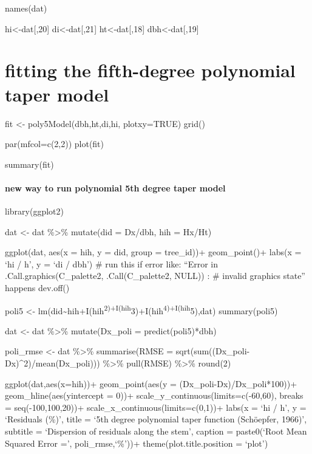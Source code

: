 \documentclass[
]{article}
\begin{document}
names(dat)

hi\textless-dat{[},20{]} di\textless-dat{[},21{]}
ht\textless-dat{[},18{]} dbh\textless-dat{[},19{]}

\hypertarget{fitting-the-fifth-degree-polynomial-taper-model}{%
\section{fitting the fifth-degree polynomial taper
model}\label{fitting-the-fifth-degree-polynomial-taper-model}}

fit \textless- poly5Model(dbh,ht,di,hi, plotxy=TRUE) grid()

par(mfcol=c(2,2)) plot(fit)

summary(fit)

\hypertarget{new-way-to-run-polynomial-5th-degree-taper-model}{%
\paragraph{new way to run polynomial 5th degree taper
model}\label{new-way-to-run-polynomial-5th-degree-taper-model}}

library(ggplot2)

dat \textless- dat \%\textgreater\% mutate(did = Dx/dbh, hih = Hx/Ht)

ggplot(dat, aes(x = hih, y = did, group = tree\_id))+ geom\_point()+
labs(x = `hi / h', y = `di / dbh') \# run this if error like: ``Error in
.Call.graphics(C\_palette2, .Call(C\_palette2, NULL)) : \# invalid
graphics state'' happens dev.off()

poli5 \textless-
lm(did\textasciitilde hih+I(hih\textsuperscript{2)+I(hih}3)+I(hih\textsuperscript{4)+I(hih}5),dat)
summary(poli5)

dat \textless- dat \%\textgreater\% mutate(Dx\_poli =
predict(poli5)*dbh)

poli\_rmse \textless- dat \%\textgreater\% summarise(RMSE =
sqrt(sum((Dx\_poli-Dx)\^{}2)/mean(Dx\_poli))) \%\textgreater\%
pull(RMSE) \%\textgreater\% round(2)

ggplot(dat,aes(x=hih))+ geom\_point(aes(y =
(Dx\_poli-Dx)/Dx\_poli*100))+ geom\_hline(aes(yintercept = 0))+
scale\_y\_continuous(limits=c(-60,60), breaks = seq(-100,100,20))+
scale\_x\_continuous(limits=c(0,1))+ labs(x = `hi / h', y = `Residuals
(\%)', title = `5th degree polynomial taper function (Schöepfer, 1966)',
subtitle = `Dispersion of residuals along the stem', caption =
paste0(`Root Mean Squared Error =', poli\_rmse,`\%'))+
theme(plot.title.position = `plot')
\end{document}
